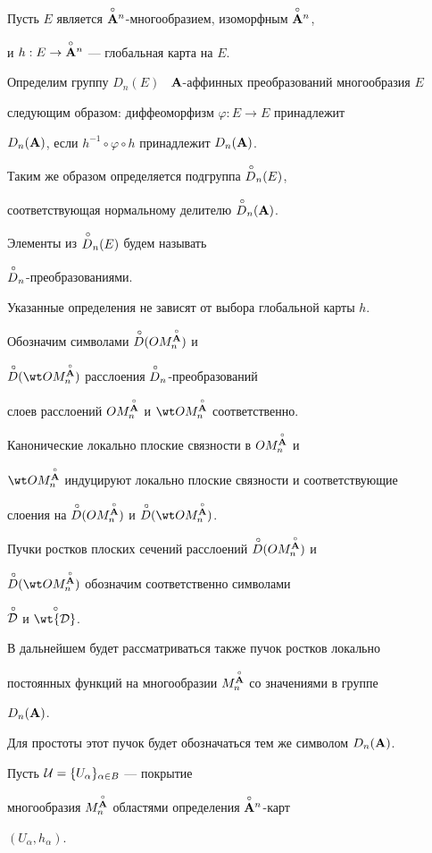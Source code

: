 Пусть $E$ является  $\overset{\circ}{\bold A}{}^n$-многообразием, изоморфным $\overset{\circ}{\bold A}{}^n$,


и $h:E\to\overset{\circ}{\bold A}{}^n$ --- глобальная карта на $E$.


Определим группу $D_n(E)$ \ ${\bold A}$-аффинных преобразований многообразия $E$


следующим образом: диффеоморфизм $\varphi:E\to E$ принадлежит


$D_n({\bold A})$, если $h^{-1}\circ\varphi\circ h$  принадлежит $D_n({\bold A}) $.


Таким же образом определяется подгруппа ${\overset{\,\circ}{D}{}}_n(E)$,


соответствующая нормальному делителю ${\overset{\,\circ}{D}{}}_n({\bold A})$.


Элементы из  ${\overset{\,\circ}{D}{}}_n(E)$ будем называть


${\overset{\,\circ}{D}{}}_n$-преобразованиями.


Указанные определения не зависят от выбора глобальной карты $h$.


Обозначим символами ${\overset{\,\circ}{D}{}}(OM^{\overset{\circ}{\bold A}{}}_n)$ и


${\puto D}(\wt OM^{\Ao}_n)$ расслоения ${\overset{\,\circ}{D}{}}_n$-преобразований


слоев расслоений $OM^{\overset{\circ}{\bold A}{}}_n$ и $\wt OM^{\Ao}_n$ соответственно.


Канонические локально плоские связности в $OM^{\overset{\circ}{\bold A}{}}_n$ и


$\wt OM^{\Ao}_n$ индуцируют локально плоские связности и соответствующие


слоения на  ${\overset{\,\circ}{D}{}}(OM^{\overset{\circ}{\bold A}{}}_n)$ и ${\puto D}(\wt OM^{\Ao}_n)$.


Пучки ростков плоских сечений расслоений ${\overset{\,\circ}{D}{}}(OM^{\overset{\circ}{\bold A}{}}_n)$ и


${\puto D}(\wt OM^{\Ao}_n)$ обозначим соответственно символами


$\overset{\,\circ}{\cal D}{}$ и $\puto{\wt{\cal D}}$.


В дальнейшем будет рассматриваться также пучок ростков локально


постоянных функций на многообразии $M^{\overset{\circ}{\bold A}{}}_n$ со значениями в группе


$D_n({\bold A})$.


Для простоты этот пучок будет обозначаться тем же символом $D_n({\bold A})$.





Пусть ${\cal U}=\{U_\alpha\}_{\alpha\in B}$ --- покрытие


многообразия $M^{\overset{\circ}{\bold A}{}}_n$ областями определения $\overset{\circ}{\bold A}{}^n$-карт


$(U_\alpha,h_\alpha)$.


